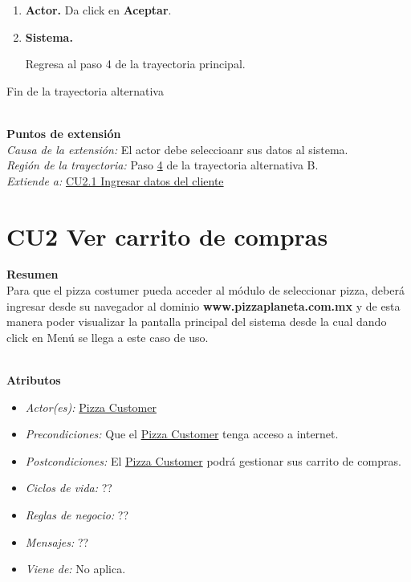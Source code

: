 \begin{itemize}
\begin{enumerate}
				\item \textbf{Actor.} Da click en \textbf{Aceptar}.
				
				\item \hypertarget{CU1:TAB:P4} {\textbf{Sistema.}} Regresa al paso 4 de la trayectoria principal.
	
			\end{enumerate}
			
			Fin de la trayectoria alternativa
		

	\end{itemize}

	\noindent \textbf{\\Puntos de extensión}\\

		\noindent \textit{Causa de la extensión:} El actor debe seleccioanr sus datos al sistema.\\
		\textit{Región de la trayectoria:} Paso \hyperlink{CU1:TAB:P4}{4} de la trayectoria alternativa B.\\
		\textit{Extiende a:} \hyperlink{CU2.1}{CU2.1 Ingresar datos del cliente}\\

		
\hypertarget{CU2}{}
\section{CU2 Ver carrito de compras}

\noindent \textbf{Resumen}\\

Para que el pizza costumer pueda acceder al módulo de seleccionar pizza, deberá ingresar desde su navegador al dominio {\textbf{www.pizzaplaneta.com.mx}} y de esta manera poder visualizar la pantalla principal del sistema desde la cual dando click en Menú se llega a este caso de uso.

\noindent \textbf{\\Atributos}

\begin{itemize}
	
	\item \textit{Actor(es):} \hyperlink{A:Pizza Customer}{Pizza Customer}
	\item \textit{Precondiciones:} Que el \hyperlink{A:Pizza Customer}{Pizza Customer} tenga acceso a internet. 
	\item \textit{Postcondiciones:} El \hyperlink{A:Pizza Customer}{Pizza Customer} podrá gestionar sus carrito de compras.
	\item \textit{Ciclos de vida:} ?? 
	\item \textit{Reglas de negocio:} ??
	\item \textit{Mensajes:} ??
	\item \textit{Viene de:} No aplica.
	
\end{itemize} 
		
